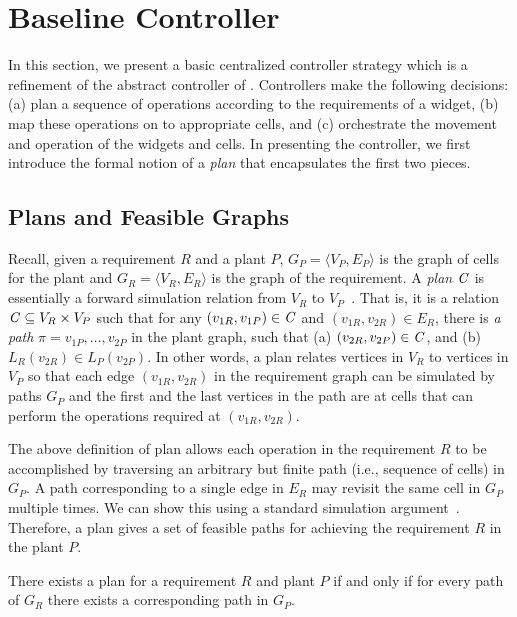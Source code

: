 \section{Baseline Controller}
\label{sec:baseline-controller}

In this section, we present a basic centralized controller strategy which is a refinement of the abstract controller of . Controllers make the following decisions:  (a) plan a sequence of operations according to the requirements of a widget, (b) map these operations on to appropriate cells, and (c) orchestrate the movement and operation of the widgets and cells. In presenting the controller, we first introduce the formal notion of a {\em plan} that encapsulates the first two pieces. 

\subsection{Plans and Feasible Graphs}
Recall, given a requirement $R$ and a plant $P$,  $G_P =\langle V_P, E_P \rangle$ is the graph of cells for the plant and
 $G_R = \langle V_R, E_R \rangle$ is the graph of the requirement. A {\em plan} $\mathit{C}$ is essentially a forward simulation relation from $V_R$ to $V_P$~\cite{lyn:fbs}. That is, it is a relation $\mathit{C} \subseteq V_R \times V_P$ such that for any $(v_{1R},v_{1P}) \in \mathit{C}$ and  $(v_{1R},v_{2R}) \in E_R$, there is {\em a path\/}  $\pi = v_{1P}, \ldots, v_{2P}$ in the plant graph, such that 
(a) $(v_{2R},v_{2P}) \in \mathit{C}$, and  
(b) $L_R(v_{2R}) \in L_P(v_{2P})$.
 In other words, a plan relates vertices in $V_R$ to vertices in $V_P$ so that each edge $(v_{1R},v_{2R})$ in the requirement graph can be simulated by paths $G_P$ and the first and the last vertices in the path are at cells that can perform the operations required at  $(v_{1R},v_{2R})$.
 
 The above definition of plan allows each operation in the requirement $R$ to be accomplished by traversing an arbitrary but finite path (i.e., sequence of cells) in $G_P$. A path corresponding to a single edge in $E_R$ may revisit the same cell in $G_P$ multiple times. 
We can show this using a standard simulation argument~\cite{lyn:fbs}. Therefore, a plan gives a set of feasible paths for achieving the requirement $R$ in the plant $P$. 
 \begin{proposition}
 	\label{prop:paths}
 	There exists a plan for a requirement $R$ and plant $P$ if and only if for every path of $G_R$ there exists a corresponding path in $G_P$.	
 \end{proposition}
 
